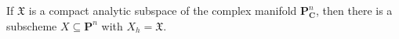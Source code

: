 If $\mathfrak{X}$ is a compact analytic subspace of the complex manifold $\mathbf{P}_{\mathbf{C}}^n$, then there is a subscheme $X \subseteq \mathbf{P}^n$ with $X_h = \mathfrak{X}$.
